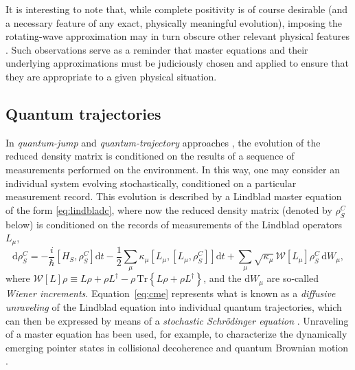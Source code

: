 \documentclass[3p,sort&compress]{elsarticle}
\newcommand{\D}{\ensuremath{\mathrm{d}}}
\newcommand{\I}{\ensuremath{i}}
\newcommand{\op}[1]{#1}
\begin{document}
It is interesting to note that, while complete positivity is of course desirable (and a necessary feature of any exact, physically meaningful evolution), imposing the rotating-wave approximation may in turn obscure other relevant physical features \cite{Dodin:2018:zz}. Such observations serve as a reminder that master equations and their underlying approximations must be judiciously chosen and applied to ensure that they are appropriate to a given physical situation.


\subsection{\label{sec:quantum-trajectories}Quantum trajectories} 

In \emph{quantum-jump} and \emph{quantum-trajectory} approaches \cite{Barchielli:1991:fv,Belavkin:1989:an,Belavkin:1989:am,Belavkin:1989:um,Belavkin:1995:tt,Diosi:1988:wx,Diosi:1988:hn,Diosi:1988:bv,Gisin:1984:qs,Gisin:1989:jn,Wiseman:1994:qq,Goan:2001:rz,Plenio:1998:bb}, the evolution of the reduced density matrix is conditioned on the results of a sequence of measurements performed on the environment. In this way, one may consider an individual system evolving stochastically, conditioned on a particular measurement record. This evolution is described by a Lindblad master equation of the form \eqref{eq:lindbladc}, where now the reduced density matrix (denoted by $\op{\rho}^C_S$ below) is conditioned on the records of measurements of the Lindblad operators $\op{L}_\mu$,
%
\begin{equation} \label{eq:cme}
\D \op{\rho}^C_S = -\frac{\I}{\hbar} \left[\op{H}_S, \op{\rho}_S^C \right] \D t  - \frac{1}{2} \sum_\mu \kappa_\mu \left[\op{L}_\mu, \left[\op{L}_\mu, \op{\rho}_S^C\right] \right] \D t + \sum_\mu \sqrt{\kappa_\mu} \, \mathcal{W}[\op{L}_\mu] \op{\rho}_S^C \, \D W_\mu,  
\end{equation}
%
where $\mathcal{W}[L]\op{\rho} \equiv L \op{\rho} + \op{\rho} L^\dagger - \op{\rho} \, \text{Tr} \left\{ L\op{\rho} + \op{\rho} L^\dagger \right\}$, and the $\D W_\mu$ are so-called \emph{Wiener increments}. Equation~\eqref{eq:cme} represents what is known as a \emph{diffusive unraveling} of the Lindblad equation into individual quantum trajectories, which can then be expressed by means of a \emph{stochastic Schr\"odinger equation} \cite{Barchielli:1991:fv,Belavkin:1989:an,Belavkin:1989:am,Belavkin:1989:um,Belavkin:1995:tt,Diosi:1988:wx,Diosi:1988:hn,Diosi:1988:bv,Gisin:1984:qs,Gisin:1989:jn,Wiseman:1994:qq,Goan:2001:rz,Plenio:1998:bb}. Unraveling of a master equation has been used, for example, to characterize the dynamically emerging pointer states in collisional decoherence \cite{Busse:2009:aa,Busse:2010:aa} and quantum Brownian motion \cite{Sorgel:2015:pp}. 
\end{document}
